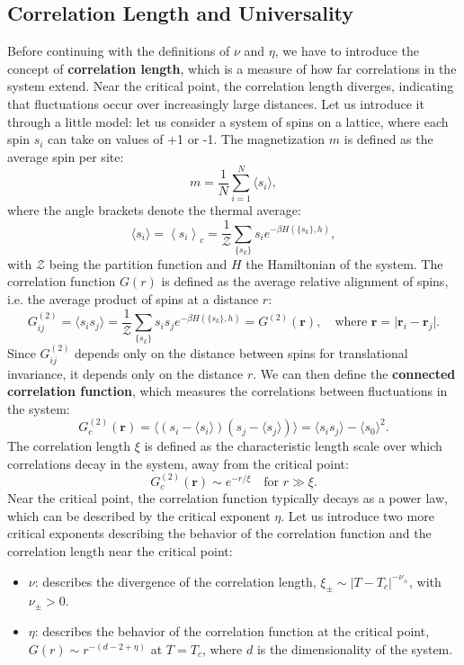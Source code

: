 \subsection{Correlation Length and Universality}

Before continuing with the definitions of \(\nu\) and \(\eta\), we have to introduce the concept of \textbf{correlation length}, which is a measure of how far correlations in the system extend. Near the critical point, the correlation length diverges, indicating that fluctuations occur over increasingly large distances. Let us introduce it through a little model: let us consider a system of spins on a lattice, where each spin \(s_i\) can take on values of +1 or -1.
The magnetization \(m\) is defined as the average spin per site:
\[
    m = \frac{1}{N} \sum_{i=1}^N \langle s_i \rangle,
\]
where the angle brackets denote the thermal average:
\[
    \langle s_i \rangle = \left\langle s_i \right\rangle_c  = \frac{1}{\mathcal{Z}} \sum_{\{s_k\}} s_i e^{-\beta H(\{s_k\},h)},
\]
with \(\mathcal{Z}\) being the partition function and \(H\) the Hamiltonian of the system. The correlation function \(G(r)\) is defined as the average relative alignment of spins, i.e. the average product of spins at a distance \(r\):
\[
    G^{(2)}_{ij} = \langle s_i s_j \rangle = \frac{1}{\mathcal{Z}} \sum_{\{s_k\}} s_i s_j e^{-\beta H(\{s_k\},h)} = G^{(2)}(\mathbf{r}), \quad \text{where } \mathbf{r} = \vert \mathbf{r}_i - \mathbf{r}_j \vert.
\]
Since \(G_{ij}^{(2)}\) depends only on the distance between spins for translational invariance, it depends only on the distance \(r\). We can then define the \textbf{connected correlation function}, which measures the correlations between fluctuations in the system:
\[
    G_c^{(2)}(\mathbf{r}) = \langle \left(s_i - \langle s_i \rangle\right) \left(s_j - \langle s_j \rangle\right) \rangle = \langle s_i s_j \rangle - \langle s_0 \rangle^2.
\]
The correlation length \(\xi\) is defined as the characteristic length scale over which correlations decay in the system, away from the critical point:
\[
    G_c^{(2)}(\mathbf{r}) \sim e^{- r/\xi} \quad \text{for } r \gg \xi.
\]
Near the critical point, the correlation function typically decays as a power law, which can be described by the critical exponent \(\eta\). Let us introduce two more critical exponents describing the behavior of the correlation function and the correlation length near the critical point:
\begin{itemize}
    \item $\nu$: describes the divergence of the correlation length, $\xi_{\pm} \sim |T - T_c|^{-\nu_{\pm}}$, with \(\nu_{\pm}>0\).
    \item $\eta$: describes the behavior of the correlation function at the critical point, $G(r) \sim r^{-(d-2+\eta)}$ at $T = T_c$, where $d$ is the dimensionality of the system.
\end{itemize}

